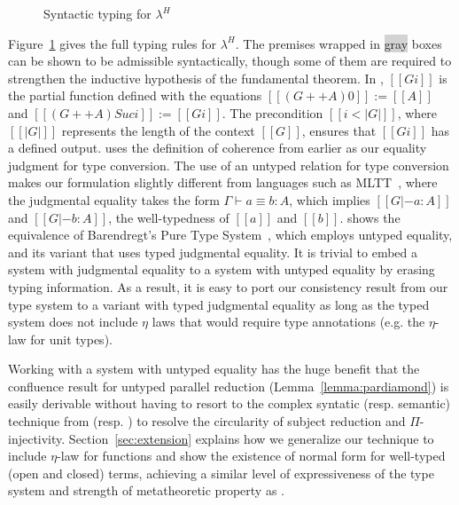 \documentclass[acmsmall]{acmart}
\newcommand{\lang}{$\lambda^H$\xspace}
\begin{document}
\begin{figure}[ht]
\begin{minipage}{0.9\textwidth}
\end{minipage}
\caption{Syntactic typing for \lang}
\label{fig:typing}
\end{figure}

Figure~\ref{fig:typing} gives the full typing rules for
\lang{}. The premises wrapped in \colorbox{lightgray}{gray} boxes can be shown to be
admissible syntactically, though some of them are required to
strengthen the inductive hypothesis of the fundamental theorem.
In , $[[G i]]$ is the partial function defined
with the equations $[[ (G ++ A)  0 ]] := [[A]]$ and $[[ (G ++ A) Suc
i ]] := [[G i]] $. The precondition $[[i < | G | ]]$, where $[[ | G |
]]$ represents the length of the context $[[G]]$, ensures that $[[G
i]]$ has a defined output.
 uses the definition of coherence from earlier
as our equality judgment for type conversion. The use of an untyped
relation for type conversion makes our formulation slightly different
from languages such as MLTT~\citep{Martin-Lof-1973}, where the judgmental equality
takes the form $\Gamma \vdash a \equiv b : A$, which implies $[[G |- a :
A]]$ and $[[G |- b : A]]$, the well-typedness of $[[a]]$ and $[[b]]$.
\citet{siles2012pure} shows the equivalence of Barendregt's
Pure Type System~\citep{barendregt1991introduction}, which employs
untyped equality, and its variant that uses typed judgmental
equality. It is trivial to embed a system with judgmental
equality to a system with untyped equality by erasing typing
information. As a result, it is easy to port our consistency result from our
type system to a variant with typed judgmental equality
as long as the typed system does not include $\eta$ laws
that would require type annotations (e.g. the $\eta$-law for unit
types). %

Working with a system with untyped equality has the huge benefit that
the confluence result for untyped parallel reduction
(Lemma~\ref{lemma:pardiamond}) is easily derivable without having to
resort to the complex syntatic (resp. semantic) technique from
\citet{siles2012pure} (resp. \citet{decagda}) to resolve
the circularity of subject reduction and $\Pi$-injectivity.
Section~\ref{sec:extension} explains how we
generalize our technique to include $\eta$-law for functions and
show the existence of normal form for well-typed (open and closed)
terms, achieving a similar level of expressiveness of the type system
and strength of metatheoretic property as \citet{decagda}.
\end{document}
